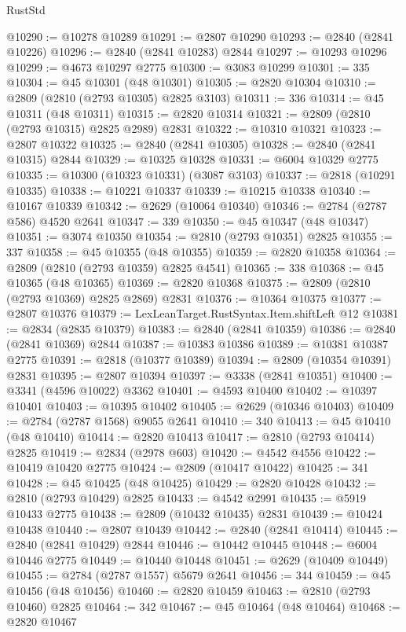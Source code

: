 \begin{lexlean}{RustStd}
\begin{coremodule}
@10290 := @10278 @10289
@10291 := @2807 @10290
@10293 := @2840 (@2841 @10226)
@10296 := @2840 (@2841 @10283) @2844
@10297 := @10293 @10296
@10299 := @4673 @10297 @2775
@10300 := @3083 @10299
@10301 := 335
@10304 := @45 @10301 (@48 @10301)
@10305 := @2820 @10304
@10310 := @2809 (@2810 (@2793 @10305) @2825 @3103)
@10311 := 336
@10314 := @45 @10311 (@48 @10311)
@10315 := @2820 @10314
@10321 := @2809 (@2810 (@2793 @10315) @2825 @2989) @2831
@10322 := @10310 @10321
@10323 := @2807 @10322
@10325 := @2840 (@2841 @10305)
@10328 := @2840 (@2841 @10315) @2844
@10329 := @10325 @10328
@10331 := @6004 @10329 @2775
@10335 := @10300 (@10323 @10331) (@3087 @3103)
@10337 := @2818 (@10291 @10335)
@10338 := @10221 @10337
@10339 := @10215 @10338
@10340 := @10167 @10339
@10342 := @2629 (@10064 @10340)
@10346 := @2784 (@2787 @586) @4520 @2641
@10347 := 339
@10350 := @45 @10347 (@48 @10347)
@10351 := @3074 @10350
@10354 := @2810 (@2793 @10351) @2825
@10355 := 337
@10358 := @45 @10355 (@48 @10355)
@10359 := @2820 @10358
@10364 := @2809 (@2810 (@2793 @10359) @2825 @4541)
@10365 := 338
@10368 := @45 @10365 (@48 @10365)
@10369 := @2820 @10368
@10375 := @2809 (@2810 (@2793 @10369) @2825 @2869) @2831
@10376 := @10364 @10375
@10377 := @2807 @10376
@10379 := LexLeanTarget.RustSyntax.Item.shiftLeft @12
@10381 := @2834 (@2835 @10379)
@10383 := @2840 (@2841 @10359)
@10386 := @2840 (@2841 @10369) @2844
@10387 := @10383 @10386
@10389 := @10381 @10387 @2775
@10391 := @2818 (@10377 @10389)
@10394 := @2809 (@10354 @10391) @2831
@10395 := @2807 @10394
@10397 := @3338 (@2841 @10351)
@10400 := @3341 (@4596 @10022) @3362
@10401 := @4593 @10400
@10402 := @10397 @10401
@10403 := @10395 @10402
@10405 := @2629 (@10346 @10403)
@10409 := @2784 (@2787 @1568) @9055 @2641
@10410 := 340
@10413 := @45 @10410 (@48 @10410)
@10414 := @2820 @10413
@10417 := @2810 (@2793 @10414) @2825
@10419 := @2834 (@2978 @603)
@10420 := @4542 @4556
@10422 := @10419 @10420 @2775
@10424 := @2809 (@10417 @10422)
@10425 := 341
@10428 := @45 @10425 (@48 @10425)
@10429 := @2820 @10428
@10432 := @2810 (@2793 @10429) @2825
@10433 := @4542 @2991
@10435 := @5919 @10433 @2775
@10438 := @2809 (@10432 @10435) @2831
@10439 := @10424 @10438
@10440 := @2807 @10439
@10442 := @2840 (@2841 @10414)
@10445 := @2840 (@2841 @10429) @2844
@10446 := @10442 @10445
@10448 := @6004 @10446 @2775
@10449 := @10440 @10448
@10451 := @2629 (@10409 @10449)
@10455 := @2784 (@2787 @1557) @5679 @2641
@10456 := 344
@10459 := @45 @10456 (@48 @10456)
@10460 := @2820 @10459
@10463 := @2810 (@2793 @10460) @2825
@10464 := 342
@10467 := @45 @10464 (@48 @10464)
@10468 := @2820 @10467

\end{coremodule}
\end{lexlean}
